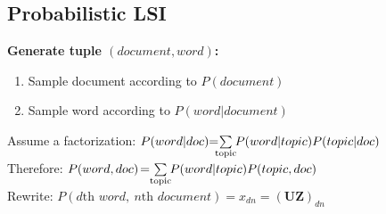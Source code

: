 \documentclass[a4paper,11pt]{article}
\begin{document}
\begin{multicols}{2}
\subsection{Probabilistic LSI}
\textbf{Generate tuple $(document, word)$:}
\begin{enumerate}[leftmargin=0.5cm]
  \itemsep0em 
  \item Sample document according to $P(document)$
  \item Sample word according to $P(word|document)$
\end{enumerate}
Assume a factorization: \hspace{-0.2cm}
$P(word|doc) \hspace{-0.1cm} = \hspace{-0.2cm} \sum\limits_{\text{topic}} \hspace{-0.1cm} P(word|topic)P(topic|doc)$\\
Therefore: \hspace{1.6cm}$P(word, doc) \hspace{-0.05cm} = \hspace{-0.1cm} \sum\limits_{\text{topic}} \hspace{-0.1cm}  P(word|topic)P(topic, doc)$\\
Rewrite: \hspace{1.8cm}$P(d\text{th } word,\ n\text{th } document) = x_{dn} = (\mathbf{UZ})_{dn}$\\
  

\end{multicols}
\end{document}

